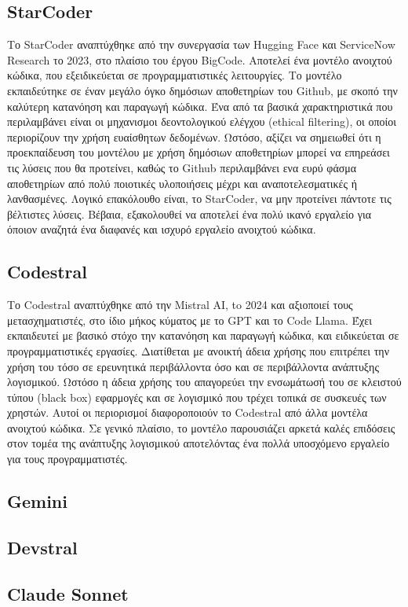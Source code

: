 \subsection{StarCoder}
Το StarCoder αναπτύχθηκε από την συνεργασία των Hugging Face και ServiceNow Research το 2023, στο πλαίσιο του έργου BigCode. Αποτελεί ένα μοντέλο ανοιχτού κώδικα, που εξειδικεύεται σε προγραμματιστικές λειτουργίες. Το μοντέλο εκπαιδεύτηκε σε έναν μεγάλο όγκο δημόσιων αποθετηρίων του Github, με σκοπό την καλύτερη κατανόηση και παραγωγή κώδικα. Ένα από τα βασικά χαρακτηριστικά που περιλαμβάνει είναι οι μηχανισμοι δεοντολογικού ελέγχου (ethical filtering), οι οποίοι περιορίζουν την χρήση ευαίσθητων δεδομένων. Ωστόσο, αξίζει να σημειωθεί ότι η προεκπαίδευση του μοντέλου με χρήση δημόσιων αποθετηρίων μπορεί να επηρεάσει τις λύσεις που θα προτείνει, καθώς το Github περιλαμβάνει ενα ευρύ φάσμα αποθετηρίων από πολύ ποιοτικές υλοποιήσεις μέχρι και αναποτελεσματικές ή λανθασμένες. Λογικό επακόλουθο είναι, το StarCoder, να μην προτείνει πάντοτε τις βέλτιστες λύσεις. Βέβαια, εξακολουθεί να αποτελεί ένα πολύ ικανό εργαλείο για όποιον αναζητά ένα διαφανές και ισχυρό εργαλείο ανοιχτού κώδικα.

\subsection{Codestral}
Το Codestral αναπτύχθηκε από την Mistral AI, to 2024 και αξιοποιεί τους μετασχηματιστές, στο ίδιο μήκος κύματος με το GPT και το Code Llama. Έχει εκπαιδευτεί με βασικό στόχο την κατανόηση και παραγωγή κώδικα, και ειδικεύεται σε προγραμματιστικές εργασίες. Διατίθεται με ανοικτή άδεια χρήσης που επιτρέπει την χρήση του τόσο σε ερευνητικά περιβάλλοντα όσο και σε περιβάλλοντα ανάπτυξης λογισμικού. Ωστόσο η άδεια χρήσης του απαγορεύει την ενσωμάτωσή του σε κλειστού τύπου (black box) εφαρμογές και σε λογισμικό που τρέχει τοπικά σε συσκευές των χρηστών. Αυτοί οι περιορισμοί διαφοροποιούν το Codestral από άλλα μοντέλα ανοιχτού κώδικα. Σε γενικό πλαίσιο, το μοντέλο παρουσιάζει αρκετά καλές επιδόσεις στον τομέα της ανάπτυξης λογισμικού αποτελόντας ένα πολλά υποσχόμενο εργαλείο για τους προγραμματιστές.

\subsection{Gemini}

\subsection{Devstral}

\subsection{Claude Sonnet}
